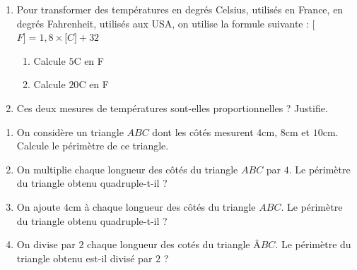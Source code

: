 \documentclass[a4paper,10pt]{report}
\begin{document}
\begin{ex}

\begin{enumerate}[font=\color{exer1}]
\item Pour transformer des températures en degrés Celsius, utilisés en France, en degrés Fahrenheit, utilisés aux USA, on utilise la formule suivante : $[$\degre $F] = 1,8 \times [$\degre $C] + 32$


\begin{enumerate}[font=\color{exer1}]
\item Calcule $5$\degre C en \degre F
\item Calcule $20$\degre C en \degre F
\end{enumerate}
\item Ces deux mesures de températures sont-elles proportionnelles ? Justifie.
\end{enumerate}
\end{ex}

\begin{ex}[Triangles]
\begin{enumerate}[font=\color{exer1}]
\item On considère un triangle $ABC$ dont les côtés mesurent $4$cm, $8$cm et $10$cm. Calcule le périmètre de ce triangle.
\item On multiplie chaque longueur des côtés du triangle $ABC$ par $4$. Le périmètre du triangle obtenu quadruple-t-il ?
\item On ajoute $4$cm à chaque longueur des côtés du triangle $ABC$. Le périmètre du triangle obtenu quadruple-t-il ?
\item On divise par $2$ chaque longueur des cotés du triangle $ÂBC$. Le périmètre du triangle obtenu est-il divisé par $2$ ?
\end{enumerate}
\end{ex}
\end{document}
